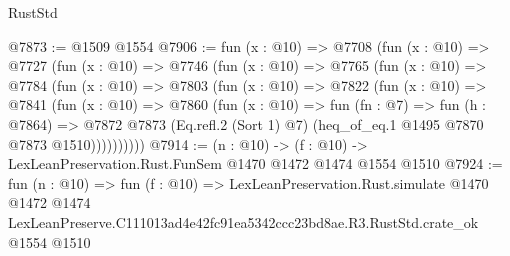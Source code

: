 \begin{lexlean}{RustStd}
\begin{coremodule}
@7873 := @1509 @1554
@7906 := fun (x : @10) =>
  @7708
    (fun (x : @10) =>
    @7727
      (fun (x : @10) =>
      @7746
        (fun (x : @10) =>
        @7765
          (fun (x : @10) =>
          @7784
            (fun (x : @10) =>
            @7803
              (fun (x : @10) =>
              @7822
                (fun (x : @10) =>
                @7841
                  (fun (x : @10) =>
                  @7860
                    (fun (x : @10) =>
                    fun (fn : @7) =>
                    fun (h : @7864) =>
                    @7872
                      @7873
                      (Eq.refl.{2} (Sort 1) @7)
                      (heq_of_eq.{1} @1495 @7870 @7873 @1510))))))))))
@7914 := (n : @10) -> (f : @10) -> LexLeanPreservation.Rust.FunSem @1470 @1472 @1474 @1554 @1510
@7924 := fun (n : @10) =>
  fun (f : @10) =>
  LexLeanPreservation.Rust.simulate
    @1470
    @1472
    @1474
    LexLeanPreserve.C111013ad4e42fc91ea5342ccc23bd8ae.R3.RustStd.crate_ok
    @1554
    @1510
\end{coremodule}
\end{lexlean}
